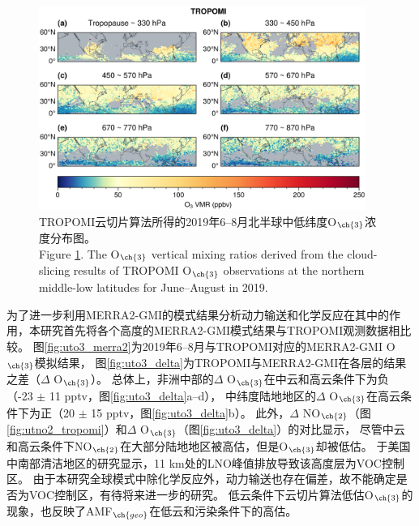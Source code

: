 \begin{figure}[H]
    \centering
    \includegraphics[width=0.95\textwidth]{./figures/uto3_tropomi.png}
    \caption{
    TROPOMI云切片算法所得的2019年6--8月北半球中低纬度O$_{\ch{3}}$浓度分布图。 \\
    Figure \ref{fig:uto3_tropomi}. The O$_{\ch{3}}$ vertical mixing ratios derived from the cloud-slicing results of TROPOMI O$_{\ch{3}}$ observations at the northern middle-low latitudes for June--August in 2019.
    }
    \label{fig:uto3_tropomi}
\end{figure}

为了进一步利用MERRA2-GMI的模式结果分析动力输送和化学反应在其中的作用，本研究首先将各个高度的MERRA2-GMI模式结果与TROPOMI观测数据相比较。
图\ref{fig:uto3_merra2}为2019年6--8月与TROPOMI对应的MERRA2-GMI O$_{\ch{3}}$模拟结果，
图\ref{fig:uto3_delta}为TROPOMI与MERRA2-GMI在各层的结果之差（$\Delta$ O$_{\ch{3}}$）。
总体上，非洲中部的$\Delta$ O$_{\ch{3}}$在中云和高云条件下为负（-23 $\pm$ 11 pptv，图\ref{fig:uto3_delta}a--d），
中纬度陆地地区的$\Delta$ O$_{\ch{3}}$在高云条件下为正（20 $\pm$ 15 pptv，图\ref{fig:uto3_delta}b）。
此外，$\Delta$ NO$_{\ch{2}}$（图\ref{fig:utno2_tropomi}）和$\Delta$ O$_{\ch{3}}$（图\ref{fig:uto3_delta}）的对比显示，
尽管中云和高云条件下NO$_{\ch{2}}$在大部分陆地地区被高估，但是O$_{\ch{3}}$却被低估。
\citet{Pickering.1990}于美国中南部清洁地区的研究显示，11 km处的LNO峰值排放导致该高度层为VOC控制区。
由于本研究全球模式中除化学反应外，动力输送也存在偏差，故不能确定是否为VOC控制区，有待将来进一步的研究。
低云条件下云切片算法低估O$_{\ch{3}}$的现象，也反映了AMF$_{\ch{geo}}$在低云和污染条件下的高估\citep{BelmonteRivas.2015}。

